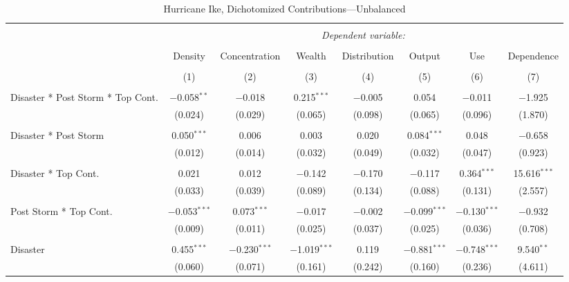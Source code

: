 
\begin{table}[!htbp] \centering 
  \caption{Hurricane Ike, Dichotomized Contributions---Unbalanced} 
  \label{} 
\footnotesize 
\begin{tabular}{@{\extracolsep{5pt}}lccccccc} 
\\[-1.8ex]\hline 
\hline \\[-1.8ex] 
 & \multicolumn{7}{c}{\textit{Dependent variable:}} \\ 
\cline{2-8} 
\\[-1.8ex] & Density & Concentration & Wealth & Distribution & Output & Use & Dependence \\ 
\\[-1.8ex] & (1) & (2) & (3) & (4) & (5) & (6) & (7)\\ 
\hline \\[-1.8ex] 
 Disaster * Post Storm * Top Cont. & $-$0.058$^{**}$ & $-$0.018 & 0.215$^{***}$ & $-$0.005 & 0.054 & $-$0.011 & $-$1.925 \\ 
  & (0.024) & (0.029) & (0.065) & (0.098) & (0.065) & (0.096) & (1.870) \\ 
  & & & & & & & \\ 
 Disaster * Post Storm & 0.050$^{***}$ & 0.006 & 0.003 & 0.020 & 0.084$^{***}$ & 0.048 & $-$0.658 \\ 
  & (0.012) & (0.014) & (0.032) & (0.049) & (0.032) & (0.047) & (0.923) \\ 
  & & & & & & & \\ 
 Disaster * Top Cont. & 0.021 & 0.012 & $-$0.142 & $-$0.170 & $-$0.117 & 0.364$^{***}$ & 15.616$^{***}$ \\ 
  & (0.033) & (0.039) & (0.089) & (0.134) & (0.088) & (0.131) & (2.557) \\ 
  & & & & & & & \\ 
 Post Storm *  Top Cont. & $-$0.053$^{***}$ & 0.073$^{***}$ & $-$0.017 & $-$0.002 & $-$0.099$^{***}$ & $-$0.130$^{***}$ & $-$0.932 \\ 
  & (0.009) & (0.011) & (0.025) & (0.037) & (0.025) & (0.036) & (0.708) \\ 
  & & & & & & & \\ 
 Disaster & 0.455$^{***}$ & $-$0.230$^{***}$ & $-$1.019$^{***}$ & 0.119 & $-$0.881$^{***}$ & $-$0.748$^{***}$ & 9.540$^{**}$ \\ 
  & (0.060) & (0.071) & (0.161) & (0.242) & (0.160) & (0.236) & (4.611) \\ 

\end{tabular}
\end{table}
